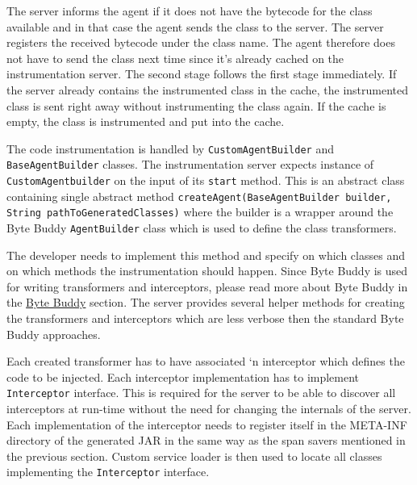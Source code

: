 The server informs the agent if it does not have the bytecode for the class available and in that case  the agent sends the class to the server. The server registers the received bytecode under the class name. The agent therefore does not have to send the class next time since it's already cached on the instrumentation server.
The second stage follows the first stage immediately. If the server already contains the instrumented class in the cache, the instrumented class is sent right away without instrumenting the class again. If the cache is empty, the class is instrumented and put into the cache.

The code instrumentation is handled by \texttt{CustomAgentBuilder} and \texttt{BaseAgentBuilder} classes.
The instrumentation server expects instance of \texttt{CustomAgentbuilder} on the input of its \texttt{start} method. This is an abstract class containing single abstract method \texttt{createAgent(BaseAgentBuilder builder, String pathToGeneratedClasses)} where the builder is a wrapper around the Byte Buddy \texttt{AgentBuilder} class which is used to define the class transformers.

The developer needs to implement this method and specify on which classes and on which methods the instrumentation should happen. Since Byte Buddy is used for writing transformers and interceptors, please read more about Byte Buddy in the \hyperref[sec:byte_buddy]{Byte Buddy} section. The server provides several helper methods for creating the transformers and interceptors which are less verbose then the standard Byte Buddy approaches.

Each created transformer has to have associated `n interceptor which defines the code to be injected. Each interceptor implementation has to implement \texttt{Interceptor}  interface. This is required for the server to be able to discover all interceptors at run-time without the need for changing the internals of the server. Each implementation of the interceptor needs to register itself in the META-INF directory of the generated JAR in the same way as the span savers mentioned in the previous section. Custom service loader is then used to locate all classes implementing the \texttt{Interceptor} interface.

